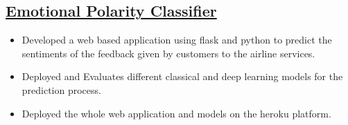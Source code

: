 \documentclass[a4paper,11pt]{article}
\begin{document}
\subsection{\href{http://knowyoursentiment.herokuapp.com}{Emotional Polarity Classifier}}
\begin{itemize}
    \item Developed a web based application using flask and python to predict the sentiments of the feedback given by customers to the airline services.
    \item Deployed and Evaluates different classical and deep learning models for the prediction process.
    \item Deployed the whole web application and models on the heroku platform.
\end{itemize}
\end{document}
